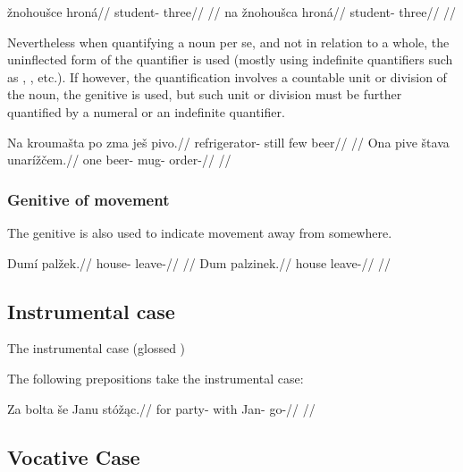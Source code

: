 \pex
\a
\begingl
\gla *žnohoušce hroná//
\glb student- three//
\glft {}//
\endgl
\a
\begingl
\gla na žnohoušca hroná//
\glb {} student- three//
\glft {}//
\endgl
\xe

Nevertheless when quantifying a noun per se, and not in relation to a whole, the uninflected form of the quantifier is used (mostly using indefinite quantifiers such as , , etc.). If however, the quantification involves a countable unit or division of the noun, the genitive is used, but such unit or division must be further quantified by a numeral or an indefinite quantifier.

\pex
\a
\begingl
\gla Na kroumašta po zma ješ pivo.//
\glb {} refrigerator- still few  beer//
\glft {}//
\endgl
\a
\begingl
\gla Ona pive štava unarížčem.//
\glb one beer- mug- order-//
\glft {}//
\endgl
\xe

\subsubsection{Genitive of movement}

The genitive is also used to indicate movement away from somewhere.

\pex
\a
\begingl
\gla Dumí palžek.//
\glb house- leave-//
\glft {}//
\endgl
\a
\begingl
\gla Dum palzinek.//
\glb house leave-//
\glft {}//
\endgl
\xe

\subsection{Instrumental case}

The instrumental case (glossed )

The following prepositions take the instrumental case:  

\pex
\begingl
\gla Za bolta še Janu st\'ož\k{a}c.//
\glb for party- with Jan- go-//
\glft {}//
\endgl
\xe


\subsection{Vocative Case}



